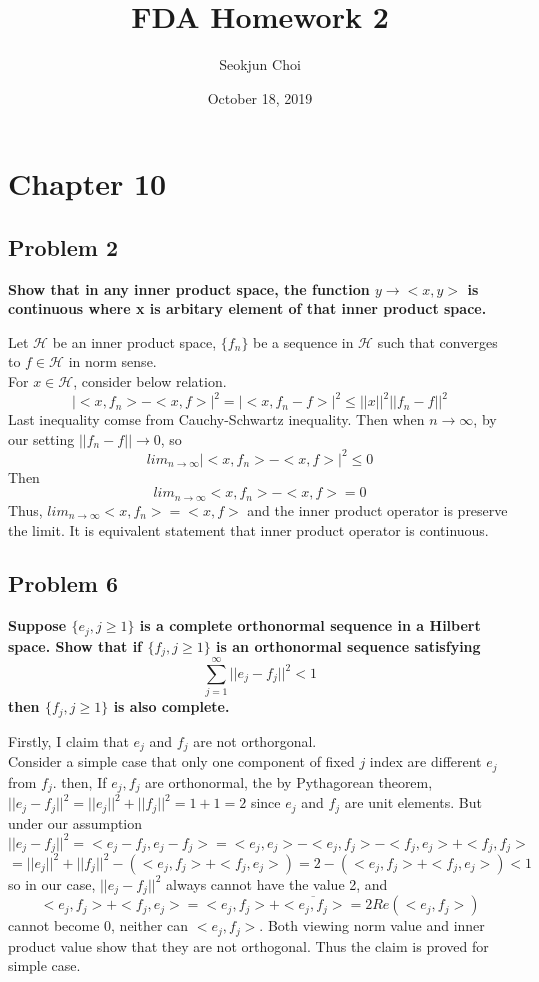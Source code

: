 \documentclass{article}
\begin{document}
\title{FDA Homework 2}
\author{Seokjun Choi}
\date{October 18, 2019}
\maketitle

\section{Chapter 10}
\subsection{Problem 2}

\textbf{
Show that in any inner product space, the function $y\rightarrow<x,y>$ is continuous where x is arbitary element of that inner product space.
}

Let $\mathcal{H}$ be an inner product space, \(\{f_n\}\) be a sequence in $\mathcal{H}$
such that converges to $f\in\mathcal{H}$ in norm sense. \\
For $x\in\mathcal{H}$, consider below relation.
\[|<x, f_n>-<x,f>|^2 = |<x, f_n-f>|^2 \leq ||x||^2||f_n-f||^2\]
Last inequality comse from Cauchy-Schwartz inequality. Then when $n\rightarrow\infty$, by our setting $||f_n-f||\rightarrow0$, so
\[lim_{n\rightarrow\infty}|<x, f_n>-<x,f>|^2\leq 0\]
Then
\[lim_{n\rightarrow\infty}<x, f_n>-<x,f>= 0\]
Thus, \(lim_{n\rightarrow\infty}<x, f_n> = <x,f>\) and the inner product operator is preserve the limit.
It is equivalent statement that inner product operator is continuous.


\subsection{Problem 6}
\textbf{
    Suppose $\{e_j,j\geq 1\}$ is a complete orthonormal sequence in a Hilbert space. 
    Show that if $\{f_j,j\geq 1\}$ is an orthonormal sequence satisfying
    \[\sum_{j=1}^\infty ||e_j-f_j||^2<1\]
    then $\{f_j,j\geq 1\}$ is also complete.
}

Firstly, I claim that $e_j$ and $f_j$ are not orthorgonal. \\
Consider a simple case that only one component of fixed $j$ index are different $e_j$ from $f_j$. then,
If $e_j, f_j$ are orthonormal, the by Pythagorean theorem, $||e_j-f_j||^2=||e_j||^2+||f_j||^2=1+1=2$
since $e_j$ and $f_j$ are unit elements. But under our assumption
\[||e_j-f_j||^2=<e_j-f_j, e_j-f_j>=<e_j, e_j>-<e_j,f_j>-<f_j,e_j>+<f_j,f_j>\]
\[=||e_j||^2+||f_j||^2-(<e_j,f_j>+<f_j,e_j>) = 2-(<e_j,f_j>+<f_j,e_j>) < 1\]
so in our case, $||e_j-f_j||^2$ always cannot have the value 2, and 
\[<e_j,f_j>+<f_j,e_j>=<e_j,f_j>+\overline{<e_j,f_j>}=2Re(<e_j,f_j>)\] cannot become 0,
neither can $<e_j,f_j>$.
Both viewing norm value and inner product value show that they are not orthogonal.
Thus the claim is proved for simple case.
\end{document}
